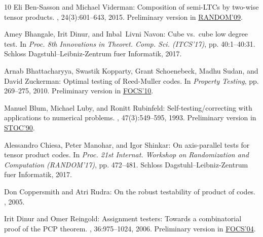 \documentclass[11pt]{article}
\numberwithin{equation}{section}
\theoremstyle{definition}
\theoremstyle{plain}
\theoremstyle{plain}
\begin{document}
\begin{thebibliography}{10}
{\sc Eli {Ben-Sasson} and Michael Viderman}: Composition of semi-{LTC}s by
  two-wise tensor products.
, 24(3):601--643, 2015.
\newblock Preliminary version in
  \href{https://doi.org/10.1007/978-3-642-03685-9\_29}{RANDOM'09}.
\newblock [\epfmtdoi{10.1007/s00037-013-0074-8}]

{\sc Amey Bhangale, Irit Dinur, and Inbal~Livni Navon}: Cube vs.\ cube low
  degree test.
\newblock In {\em Proc. 8th Innovations in Theoret. Comp. Sci. (ITCS'17)}, pp.
  40:1--40:31. Schloss Dagstuhl--Leibniz-Zentrum fuer Informatik, 2017.

{\sc Arnab Bhattacharyya, Swastik Kopparty, Grant Schoenebeck, Madhu Sudan, and
  David Zuckerman}: Optimal testing of {R}eed-{M}uller codes.
\newblock In {\em Property Testing}, pp. 269--275, 2010.
\newblock Preliminary version in
  \href{https://doi.org/10.1109/FOCS.2010.54}{FOCS'10}.

{\sc Manuel Blum, Michael Luby, and Ronitt Rubinfeld}: Self-testing/correcting
  with applications to numerical problems.
, 47(3):549--595, 1993.
\newblock Preliminary version in
  \href{https://doi.org/10.1145/100216.100225}{STOC'90}.
\newblock [\epfmtdoi{10.1016/0022-0000(93)90044-W}]

{\sc Alessandro Chiesa, Peter Manohar, and Igor Shinkar}: On axis-parallel
  tests for tensor product codes.
\newblock In {\em Proc. 21st Internat. Workshop on Randomization and
  Computation (RANDOM'17)}, pp. 472--481. Schloss Dagstuhl--Leibniz-Zentrum
  fuer Informatik, 2017.

{\sc Don Coppersmith and Atri Rudra}: On the robust testability of product of
  codes.
, 2005.

{\sc Irit Dinur and Omer Reingold}: Assignment testers: Towards a combinatorial
  proof of the {PCP} theorem.
, 36:975--1024, 2006.
\newblock Preliminary version in
  \href{https://doi.org/10.1109/FOCS.2004.16}{FOCS'04}.
\newblock [\epfmtdoi{10.1137/S0097539705446962}]


\end{thebibliography}
\end{document}
